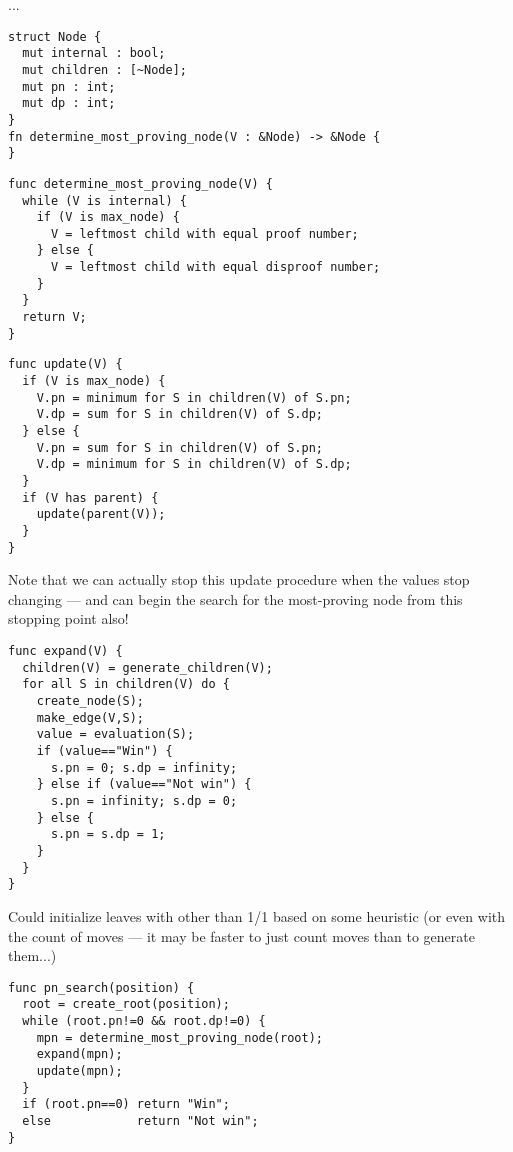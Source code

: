 \documentclass[10pt,dvipdfmx]{report}
\begin{document}
...
\begin{verbatim}
struct Node {
  mut internal : bool;
  mut children : [~Node];
  mut pn : int;
  mut dp : int;
}
fn determine_most_proving_node(V : &Node) -> &Node {
}
\end{verbatim}

\begin{verbatim}
func determine_most_proving_node(V) {
  while (V is internal) {
    if (V is max_node) {
      V = leftmost child with equal proof number;
    } else {
      V = leftmost child with equal disproof number;
    }
  }
  return V;
}
\end{verbatim}

\begin{verbatim}
func update(V) {
  if (V is max_node) {
    V.pn = minimum for S in children(V) of S.pn;
    V.dp = sum for S in children(V) of S.dp;
  } else {
    V.pn = sum for S in children(V) of S.pn;
    V.dp = minimum for S in children(V) of S.dp;
  }
  if (V has parent) {
    update(parent(V));
  }
}
\end{verbatim}
Note that we can actually stop this update procedure when
the values stop changing --- and can begin the search
for the most-proving node from this stopping point also!

\begin{verbatim}
func expand(V) {
  children(V) = generate_children(V);
  for all S in children(V) do {
    create_node(S);
    make_edge(V,S);
    value = evaluation(S);
    if (value=="Win") {
      s.pn = 0; s.dp = infinity;
    } else if (value=="Not win") {
      s.pn = infinity; s.dp = 0;
    } else {
      s.pn = s.dp = 1;
    }
  }
}
\end{verbatim}
Could initialize leaves with other than 1/1 based on some heuristic
(or even with the count of moves --- it may be faster to just count
moves than to generate them...)

\begin{verbatim}
func pn_search(position) {
  root = create_root(position);
  while (root.pn!=0 && root.dp!=0) {
    mpn = determine_most_proving_node(root);
    expand(mpn);
    update(mpn);
  }
  if (root.pn==0) return "Win";
  else            return "Not win";
}
\end{verbatim}
\end{document}
